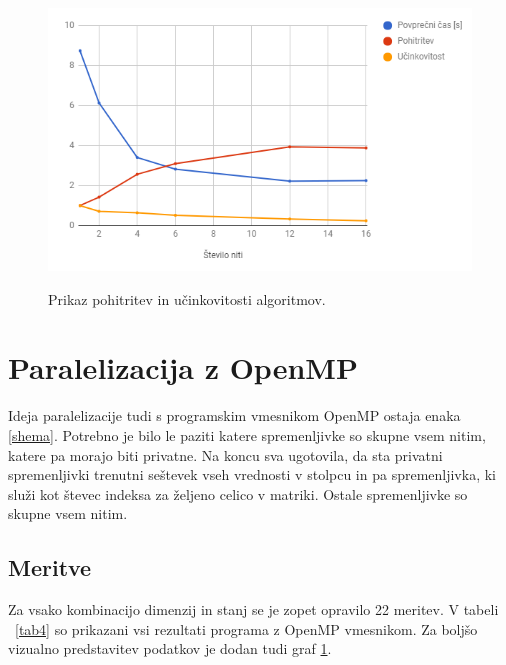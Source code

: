 \documentclass[a4paper,11pt]{article}
\begin{document}
\begin{figure}[H]
\begin{center}
\caption{Prikaz pohitritev in učinkovitosti algoritmov.}
\includegraphics[scale=1]{GrafUcinkovitost.png}
\label{grafOpenMP}
\end{center}
\end{figure}


\section{Paralelizacija z OpenMP}
Ideja paralelizacije tudi s programskim vmesnikom OpenMP ostaja enaka \ref{shema}. Potrebno je bilo le paziti katere spremenljivke so skupne vsem nitim, katere pa morajo biti privatne. Na koncu sva ugotovila, da sta privatni spremenljivki trenutni seštevek vseh vrednosti v stolpcu in pa spremenljivka, ki služi kot števec indeksa za željeno celico v matriki. Ostale spremenljivke so skupne vsem nitim.

\subsection{Meritve}
Za vsako kombinacijo dimenzij in stanj se je zopet opravilo 22 meritev. V tabeli ~\ref{tab4} so prikazani vsi rezultati programa z OpenMP vmesnikom. Za boljšo vizualno predstavitev podatkov je dodan tudi graf \ref{grafOpenMP}.
\end{document}
